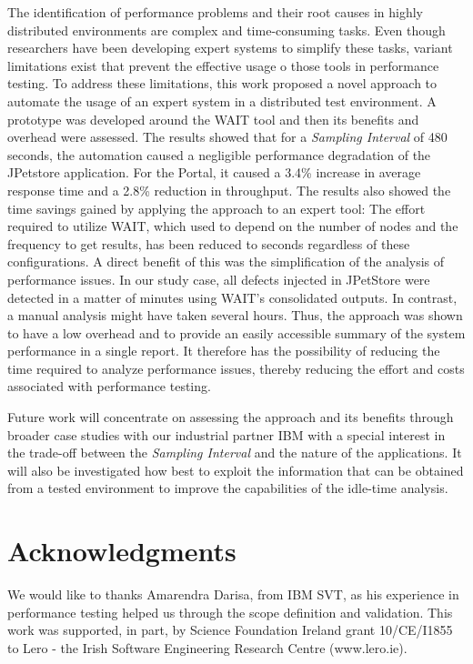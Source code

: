 \documentclass[runningheads,a4paper]{llncs}
\begin{document}
The identification of performance problems and their root causes in highly
distributed environments are complex and time-consuming tasks. Even though
researchers have been developing expert systems to simplify these tasks, variant
limitations exist that prevent the effective usage o those tools in performance
testing. To address these limitations, this work proposed a novel approach to
automate the usage of an expert system in a distributed test environment. A
prototype was developed around the WAIT tool and then its benefits and overhead
were assessed. The results showed that for a \emph{Sampling Interval} of 480 seconds, 
the automation caused a negligible performance degradation of the JPetstore
application. For the Portal, it caused a 3.4\% increase in average response time
and a 2.8\% reduction in throughput. The results also showed the time savings
gained by applying the approach to an expert tool: The effort required to utilize WAIT,
which used to depend on the number of nodes and the frequency to get results,
has been reduced to seconds regardless of these configurations. A direct benefit
of this was the simplification of the analysis of performance issues. In our
study case, all defects injected in JPetStore were detected in a matter of
minutes using WAIT's consolidated outputs. In contrast, a manual analysis might
have taken several hours. Thus, the approach was shown to have a low overhead
and to provide an easily accessible summary of the system performance in a
single report. It therefore has the possibility of reducing the time required to 
analyze performance issues, thereby reducing the effort and costs associated
with performance testing.

Future work will concentrate on assessing the approach and its benefits through
broader case studies with our industrial partner IBM with a special interest in 
the trade-off between the \emph{Sampling
Interval} and the nature of the applications.  It will also be investigated how
best to exploit the information that can be obtained from a tested environment
to improve the capabilities of the idle-time analysis.

\vspace{-5pt}
\section*{Acknowledgments}
\vspace{-5pt}
We would like to thanks Amarendra Darisa, from IBM SVT, as his experience in
performance testing helped us through the scope definition and validation. This
work was supported, in part, by Science Foundation Ireland grant 10/CE/I1855 to
Lero - the Irish Software Engineering Research Centre (www.lero.ie).

\vspace{-5pt}



\end{document}
